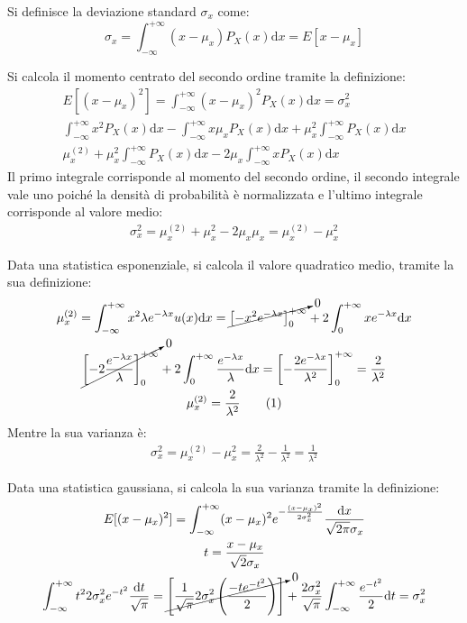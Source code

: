 \documentclass{article}
\newcommand{\df}{\mathrm{d}}
\newcommand{\tageq}{\tag{\stepcounter{equation}\theequation}}
\numberwithin{equation}{subsection}
\begin{document}
Si definisce la deviazione standard $\sigma_x$ come:
\begin{equation}
    \sigma_x=\displaystyle\int_{-\infty}^{+\infty}(x-\mu_x)P_X(x)\df x=E[x-\mu_x]
\end{equation}


Si calcola il momento centrato del secondo ordine tramite la definizione:
\begin{gather*}
    E\left[(x-\mu_x)^2\right]=\displaystyle\int_{-\infty}^{+\infty}(x-\mu_x)^2P_X(x)\df x=\sigma_x^2\\
    \int_{-\infty}^{+\infty}x^2P_X(x)\df x-\int_{-\infty}^{+\infty}x\mu_xP_X(x)\df x+\mu_x^2\int_{-\infty}^{+\infty}P_X(x)\df x\\
    \mu_x^{(2)}+\mu_x^2\int_{-\infty}^{+\infty}P_X(x)\df x-2\mu_x\int_{-\infty}^{+\infty}xP_X(x)\df x
\end{gather*}
Il primo integrale corrisponde al momento del secondo ordine, il secondo integrale vale uno poiché la densità di probabilità è normalizzata e l'ultimo 
integrale corrisponde al valore medio:
\begin{gather}
    \sigma_x^2=\mu_x^{(2)}+\mu_x^2-2\mu_x\mu_x=\mu_x^{(2)}-\mu_x^2
\end{gather}

Data una statistica esponenziale, si calcola il valore quadratico medio, tramite la sua definizione:
\begin{gather*}
    \mu_x^{(2)}=\displaystyle\int_{-\infty}^{+\infty}x^2\lambda e^{-\lambda x}u(x)\df x=\cancelto{0}{\left[-x^2e^{-\lambda x}\right]_0^{+\infty}}+2\int_{0}^{+\infty}xe^{-\lambda x}\df x\\
    \cancelto{0}{\left[-2\displaystyle\frac{e^{-\lambda x}}{\lambda}\right]_0^{+\infty}}+2\int_{0}^{+\infty}\frac{e^{-\lambda x}}{\lambda}\df x=\left[-\frac{2e^{-\lambda x}}{\lambda^2}\right]^{+\infty}_0=\frac{2}{\lambda^2}\\
    \mu_x^{(2)}=\displaystyle\frac{2}{\lambda^2}\tageq
\end{gather*}
Mentre la sua varianza è:
\begin{gather}
    \sigma_x^2=\mu_x^{(2)}-\mu_x^2=\displaystyle\frac{2}{\lambda^2}-\frac{1}{\lambda^2}=\frac{1}{\lambda^2}
\end{gather}


Data una statistica gaussiana, si calcola la sua varianza tramite la definizione:
\begin{gather*}
    E[(x-\mu_x)^2]=\displaystyle\int_{-\infty}^{+\infty}(x-\mu_x)^2e^{-\frac{(x-\mu_x)^2}{2\sigma_x^2}}\frac{\df x}{\sqrt{2\pi}\sigma_x}\\
    t=\displaystyle\frac{x-\mu_x}{\sqrt{2}\sigma_x}\\
    \displaystyle\int_{-\infty}^{+\infty}t^22\sigma_x^2e^{-t^2}\frac{\df t}{\sqrt{\pi}}=\cancelto{0}{\left[\frac{1}{\sqrt{\pi}}2\sigma_x^2\left(\frac{-te^{-t^2}}{2}\right)\right]}+\frac{2\sigma_x^2}{\sqrt{\pi}}\int_{-\infty}^{+\infty}\frac{e^{-t^2}}{2}\df t=\sigma_x^2
\end{gather*}
\end{document}
